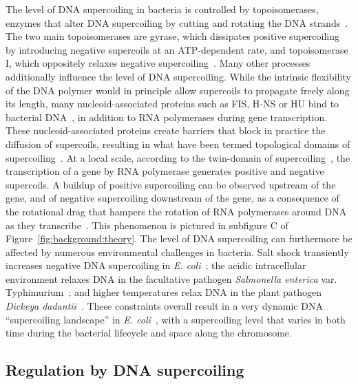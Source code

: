 The level of DNA supercoiling in bacteria is controlled by topoisomerases, enzymes that alter DNA supercoiling by cutting and rotating the DNA strands~\citep{duprey2021}.
The two main topoisomerases are gyrase, which dissipates positive supercoiling by introducing negative supercoils at an ATP-dependent rate, and topoisomerase I, which oppositely relaxes negative supercoiling~\citep{martisb.2019}.
Many other processes additionally influence the level of DNA supercoiling.
While the intrinsic flexibility of the DNA polymer would in principle allow supercoils to propagate freely along its length, many nucleoid-associated proteins such as FIS, H-NS or HU bind to bacterial DNA~\citep{krogh2018}, in addition to RNA polymerases during gene transcription.
These nucleoid-associated proteins create barriers that block in practice the diffusion of supercoils, resulting in what have been termed topological domains of supercoiling~\citep{postow2004}.
At a local scale, according to the twin-domain of supercoiling~\citep{liu1987}, the transcription of a gene by RNA polymerase generates positive and negative supercoils.
A buildup of positive supercoiling can be observed upstream of the gene, and of negative supercoiling downstream of the gene, as a consequence of the rotational drag that hampers the rotation of RNA polymerases around DNA as they transcribe~\citep{visser2022}.
This phenomenon is pictured in subfigure C of Figure~\ref{fig:background:theory}.
The level of DNA supercoiling can furthermore be affected by numerous environmental challenges in bacteria.
Salt shock transiently increases negative DNA supercoiling in \emph{E. coli}~\citep{hsieh1991}; the acidic intracellular environment relaxes DNA in the facultative pathogen \emph{Salmonella enterica} var. Typhimurium~\citep{marshall2000}; and higher temperatures relax DNA in the plant pathogen \emph{Dickeya dadantii}~\citep{herault2014}.
These constraints overall result in a very dynamic DNA ``supercoiling landscape'' in \emph{E. coli}~\citep{visser2022}, with a supercoiling level that varies in both time during the bacterial lifecycle and space along the chromosome.

\subsection{Regulation by DNA supercoiling}

